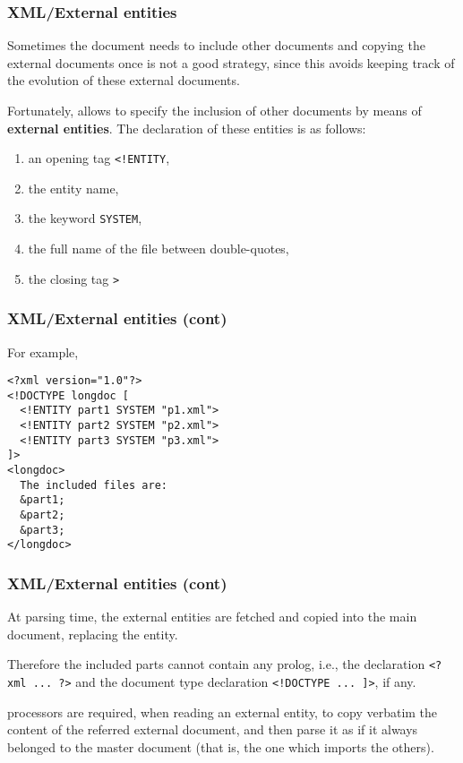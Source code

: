 %
\begin{frame}[containsverbatim]
\frametitle{XML/External entities}

Sometimes the \XML document needs to include other \XML documents and
copying the external documents once is not a good strategy, since this
avoids keeping track of the evolution of these external documents.

\bigskip

Fortunately, \XML allows to specify the inclusion of other \XML
documents by means of \textbf{external entities}. The declaration of
these entities is as follows:
\begin{enumerate}

  \item an opening tag \verb|<!ENTITY|,

  \item the entity name,

  \item the keyword \verb|SYSTEM|,

  \item the full name of the \XML file between double-quotes,

  \item the closing tag \verb|>|

\end{enumerate}

\end{frame}

%
\begin{frame}[containsverbatim]
\frametitle{XML/External entities (cont)}

For example,
\begin{verbatim}
<?xml version="1.0"?>
<!DOCTYPE longdoc [
  <!ENTITY part1 SYSTEM "p1.xml">
  <!ENTITY part2 SYSTEM "p2.xml">
  <!ENTITY part3 SYSTEM "p3.xml">
]>
<longdoc>
  The included files are:
  &part1;
  &part2;
  &part3;
</longdoc>
\end{verbatim}

\end{frame}

%
\begin{frame}[containsverbatim]
\frametitle{XML/External entities (cont)}

At parsing time, the external entities are fetched and copied into the
main \XML document, replacing the entity.

\bigskip

Therefore the included parts cannot contain any prolog, i.e., the \XML
declaration \verb|<?xml ... ?>| and the document type declaration
\verb|<!DOCTYPE ... ]>|, if any.

\bigskip

\XML processors are required, when reading an external entity, to copy
verbatim the content of the referred external document, and then parse
it as if it always belonged to the master document (that is, the one
which imports the others).

\end{frame}

